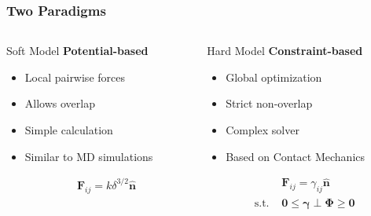 \documentclass[10pt,t]{beamer}
\begin{document}
\begin{frame}
    \frametitle{Two Paradigms}

    \vspace{-0.5cm}
    \begin{columns}
        \begin{column}{0.5\textwidth}
            \begin{block}{Soft Model}
                \textbf{Potential-based}

                \begin{itemize}
                    \item Local pairwise forces
                    \item Allows overlap
                    \item Simple calculation
                    \item Similar to MD simulations
                \end{itemize}

                \begin{equation*}
                    \begin{align}
                                  & \mathbf{F}_{ij} = k \delta^{3/2} \hat{\mathbf{n}} \\
                        \text{  } &
                    \end{align}
                \end{equation*}
                \vfill
            \end{block}
        \end{column}

        \begin{column}{0.5\textwidth}
            \begin{block}{Hard Model \cite{Weady2024}}
                \textbf{Constraint-based}

                \begin{itemize}
                    \item Global optimization
                    \item Strict non-overlap
                    \item Complex solver
                    \item Based on Contact Mechanics
                \end{itemize}

                \begin{equation*}
                    \begin{align}
                                     & \mathbf{F}_{ij} = \gamma_{ij} \hat{\mathbf{n}}                              \\
                        \text{s.t. } & \mathbf{0} \leq \boldsymbol{\gamma} \perp \boldsymbol{\Phi} \geq \mathbf{0}
                    \end{align}
                \end{equation*}
                \vfill
            \end{block}
        \end{column}
    \end{columns}

\end{frame}
\end{document}
